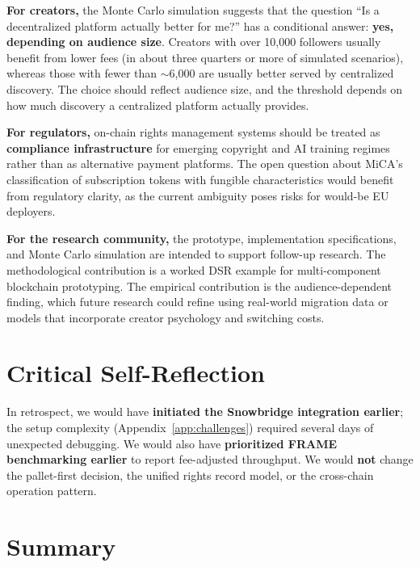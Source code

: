 \textbf{For creators,} the Monte Carlo simulation suggests that the question ``Is a decentralized platform actually better for me?'' has a conditional answer: \textbf{yes, depending on audience size}. Creators with over 10,000 followers usually benefit from lower fees (in about three quarters or more of simulated scenarios), whereas those with fewer than $\sim$6,000 are usually better served by centralized discovery. The choice should reflect audience size, and the threshold depends on how much discovery a centralized platform actually provides.

\textbf{For regulators,} on-chain rights management systems should be treated as \textbf{compliance infrastructure} for emerging copyright and AI training regimes rather than as alternative payment platforms. The open question about MiCA's classification of subscription tokens with fungible characteristics would benefit from regulatory clarity, as the current ambiguity poses risks for would-be EU deployers.

\textbf{For the research community,} the prototype, implementation specifications, and Monte Carlo simulation are intended to support follow-up research. The methodological contribution is a worked DSR example for multi-component blockchain prototyping. The empirical contribution is the audience-dependent finding, which future research could refine using real-world migration data or models that incorporate creator psychology and switching costs.

\section{Critical Self-Reflection}\label{sec:self-reflection}

In retrospect, we would have \textbf{initiated the Snowbridge integration earlier}; the setup complexity (Appendix~\ref{app:challenges}) required several days of unexpected debugging. We would also have \textbf{prioritized FRAME benchmarking earlier} to report fee-adjusted throughput. We would \textbf{not} change the pallet-first decision, the unified rights record model, or the cross-chain operation pattern.

\section{Summary}\label{sec:chapter-8-summary}

